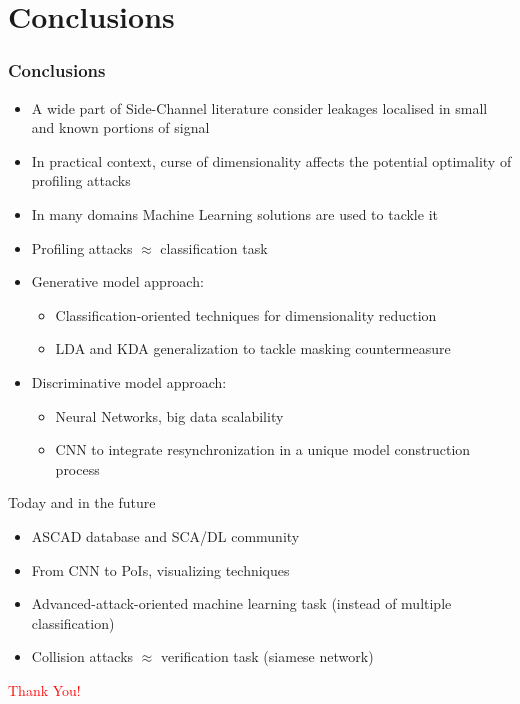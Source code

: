 
\section{Conclusions}

\begin{frame}
\frametitle{Conclusions}
\vspace{-10pt}
\begin{itemize}
\item A wide part of Side-Channel literature consider leakages localised in small and known portions of signal
\item In practical context, curse of dimensionality affects the potential optimality of profiling attacks
\item In many domains Machine Learning solutions are used to tackle it
\item Profiling attacks $\approx$ classification task
\item Generative model approach:
\begin{itemize}
\item Classification-oriented techniques for dimensionality reduction 
\item LDA and KDA generalization to tackle masking countermeasure
\end{itemize}
\item Discriminative model approach:
\begin{itemize}
\item Neural Networks, big data scalability
\item CNN to integrate resynchronization in a unique model construction process
\end{itemize}
\end{itemize}
\pause
\begin{block}{Today and in the future}
\begin{itemize}
\item ASCAD database and SCA/DL community
\item From CNN to PoIs, visualizing techniques
\item Advanced-attack-oriented machine learning task (instead of multiple classification)
\item Collision attacks $\approx$ verification task (siamese network)
\end{itemize}
\end{block}
\pause
\vspace*{-20pt}
\begin{huge}
\textcolor{red}{\hfill Thank You!}
\end{huge}

\end{frame}

